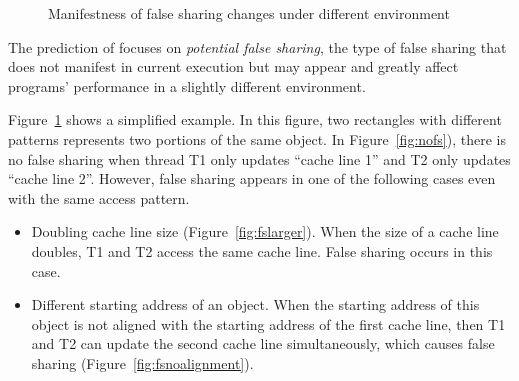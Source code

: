 \begin{figure}
\begin{center} 
%
\hspace{30pt}
%
\hspace{30pt}
%
\end{center}
\caption{Manifestness of false sharing changes under different environment}
\label{fig:potentialfalsesharing}
\end{figure}

The prediction of \Predator{} focuses on {\it potential false sharing}, the type of
false sharing that does not 
manifest in current execution but may appear and greatly affect programs' performance
in a slightly different environment.

Figure~\ref{fig:potentialfalsesharing} shows a simplified example.
In this figure, two rectangles with different patterns
represents two portions of the same object. 
In Figure~\ref{fig:nofs}), there is no false sharing when thread T1 only updates 
``cache line 1'' and T2 only updates ``cache line 2''.
However, false sharing appears in one of the following cases even with the same
access pattern. 

\begin{itemize}
\item
Doubling cache line size (Figure~\ref{fig:fslarger}). When the size of a
cache line doubles,
T1 and T2 access the same cache line. False sharing occurs in this case.

\item
Different starting address of an object. 
When the starting address of this object is not aligned with the starting address of 
the first cache line, 
then T1 and T2 can update the second cache line simultaneously, 
which causes false sharing (Figure~\ref{fig:fsnoalignment}). 
\end{itemize} 

